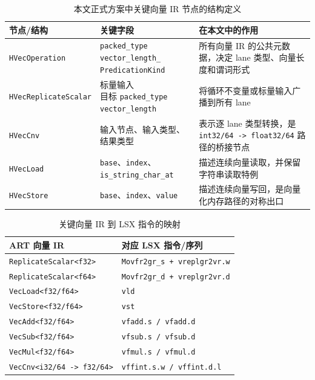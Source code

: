 \begin{table}[htbp]
    \centering
    \small
    \caption{本文正式方案中关键向量 IR 节点的结构定义}
    \label{tab:vector-ir-structure}
    \begin{tabular}{p{3.0cm}p{4.5cm}p{3.8cm}}
        \toprule
        \textbf{节点/结构} & \textbf{关键字段} & \textbf{在本文中的作用} \\
        \midrule
        \texttt{HVecOperation} & \shortstack[l]{\texttt{packed\_type}\\\texttt{vector\_length\_}\\\texttt{PredicationKind}} & 所有向量 IR 的公共元数据，决定 lane 类型、向量长度和谓词形式 \\
        \texttt{HVecReplicateScalar} & \shortstack[l]{标量输入\\目标 \texttt{packed\_type}\\\texttt{vector\_length}} & 将循环不变量或标量输入广播到所有 lane \\
        \texttt{HVecCnv} & 输入节点、输入类型、结果类型 & 表示逐 lane 类型转换，是 \texttt{int32/64 -> float32/64} 路径的桥接节点 \\
        \texttt{HVecLoad} & \texttt{base}、\texttt{index}、\texttt{is\_string\_char\_at} & 描述连续向量读取，并保留字符串读取特例 \\
        \texttt{HVecStore} & \texttt{base}、\texttt{index}、\texttt{value} & 描述连续向量写回，是向量化内存路径的对称出口 \\
        \bottomrule
    \end{tabular}
\end{table}

\begin{table}[htbp]
    \centering
    \small
    \caption{关键向量 IR 到 LSX 指令的映射}
    \label{tab:ir-to-lsx-mapping}
    \begin{tabular}{p{4.4cm}p{6.2cm}}
        \toprule
        \textbf{ART 向量 IR} & \textbf{对应 LSX 指令/序列} \\
        \midrule
        \texttt{ReplicateScalar<f32>} & \texttt{Movfr2gr\_s + vreplgr2vr.w} \\
        \texttt{ReplicateScalar<f64>} & \texttt{Movfr2gr\_d + vreplgr2vr.d} \\
        \texttt{VecLoad<f32/f64>} & \texttt{vld} \\
        \texttt{VecStore<f32/f64>} & \texttt{vst} \\
        \texttt{VecAdd<f32/f64>} & \texttt{vfadd.s / vfadd.d} \\
        \texttt{VecSub<f32/f64>} & \texttt{vfsub.s / vfsub.d} \\
        \texttt{VecMul<f32/f64>} & \texttt{vfmul.s / vfmul.d} \\
        \texttt{VecCnv<i32/64 -> f32/64>} & \texttt{vffint.s.w / vffint.d.l} \\
        \bottomrule
    \end{tabular}
\end{table}


